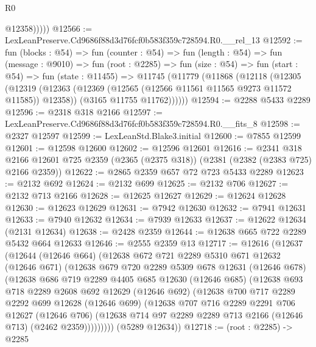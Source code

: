 \begin{lexlean}{R0}
\begin{coremodule}
              @12358)))))
@12566 := LexLeanPreserve.Cd9686f88d3d76fcf0b583f359c728594.R0.__rel_13
@12592 := fun (blocks : @54) =>
  fun (counter : @54) =>
  fun (length : @54) =>
  fun (message : @9010) =>
  fun (root : @2285) =>
  fun (size : @54) =>
  fun (start : @54) =>
  fun (state : @11455) =>
  @11745
    (@11779
      (@11868
        (@12118
          (@12305
            (@12319
              (@12363 (@12369 (@12565 (@12566 @11561 @11565 @9273 @11572 @11585)) @12358))
              (@3165 @11755 @11762))))))
@12594 := @2288 @5433 @2289
@12596 := @2318 @318 @2166
@12597 := LexLeanPreserve.Cd9686f88d3d76fcf0b583f359c728594.R0.__fits_8
@12598 := @2327 @12597
@12599 := LexLeanStd.Blake3.initial
@12600 := @7855 @12599
@12601 := @12598 @12600
@12602 := @12596 @12601
@12616 := @2341
    @318
    @2166
    @12601
    @725
    @2359
    (@2365 (@2375 @318))
    (@2381 (@2382 (@2383 @725) @2166 @2359))
@12622 := @2865 @2359 @657 @72 @723 @5433 @2289
@12623 := @2132 @692
@12624 := @2132 @699
@12625 := @2132 @706
@12627 := @2132 @713 @2166
@12628 := @12625 @12627
@12629 := @12624 @12628
@12630 := @12623 @12629
@12631 := @7942 @12630
@12632 := @7941 @12631
@12633 := @7940 @12632
@12634 := @7939 @12633
@12637 := @12622 @12634 (@2131 @12634)
@12638 := @2428 @2359
@12644 := @12638 @665 @722 @2289 @5432 @664 @12633
@12646 := @2555 @2359 @13
@12717 := @12616
    (@12637
      (@12644
        (@12646 @664)
        (@12638
          @672
          @721
          @2289
          @5310
          @671
          @12632
          (@12646 @671)
          (@12638
            @679
            @720
            @2289
            @5309
            @678
            @12631
            (@12646 @678)
            (@12638
              @686
              @719
              @2289
              @4405
              @685
              @12630
              (@12646 @685)
              (@12638
                @693
                @718
                @2289
                @2608
                @692
                @12629
                (@12646 @692)
                (@12638
                  @700
                  @717
                  @2289
                  @2292
                  @699
                  @12628
                  (@12646 @699)
                  (@12638
                    @707
                    @716
                    @2289
                    @2291
                    @706
                    @12627
                    (@12646 @706)
                    (@12638 @714 @97 @2289 @2289 @713 @2166 (@12646 @713) (@2462 @2359)))))))))
      (@5289 @12634))
@12718 := (root : @2285) -> @2285

\end{coremodule}
\end{lexlean}
